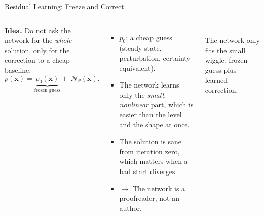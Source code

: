 \documentclass[aspectratio=169,11pt]{beamer}
\newcommand{\emphc}[1]{\textcolor{harvardcrimson}{#1}}
\newcommand{\x}{\bm{x}}
\newcommand{\param}{\theta}          %
\newcommand{\state}{\bm{x}}          %
\newcommand{\net}{\mathcal{N}_{\param}} %
\begin{document}
\begin{frame}{Residual Learning: Freeze and Correct}
\begin{columns}[T,onlytextwidth]
\textbf{Idea.} Do not ask the network for the \emph{whole} solution, only for the \emphc{correction} to a cheap baseline:
\[
  p(\state)=\underbrace{p_0(\state)}_{\text{frozen guess}}
   +\;\net(\state).
\]
\begin{itemize}\setlength\itemsep{3pt}\footnotesize
  \item $p_0$: a cheap guess (steady state, perturbation, certainty equivalent).
  \item The network learns only the \emph{small, nonlinear} part, which is easier than the level and the shape at once.
  \item The solution is sane from iteration zero, which matters when a bad start diverges.
  \item $\rightarrow$ \emphc{The network is a proofreader, not an author.}
\end{itemize}
\centering
{}\\[2pt]
{\footnotesize The network only fits the small wiggle: frozen guess plus learned correction.}
\end{columns}
\end{frame}
\end{document}
